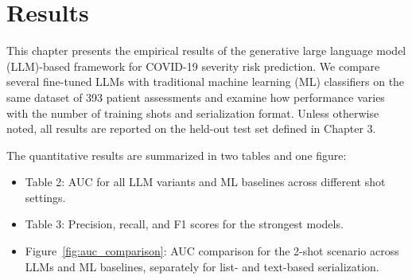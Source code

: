 \section{Results}

This chapter presents the empirical results of the generative large language model (LLM)-based framework for COVID-19 severity risk prediction. We compare several fine-tuned LLMs with traditional machine learning (ML) classifiers on the same dataset of 393 patient assessments and examine how performance varies with the number of training shots and serialization format. Unless otherwise noted, all results are reported on the held-out test set defined in Chapter 3.

The quantitative results are summarized in two tables and one figure:
\begin{itemize}
    \item Table 2: AUC for all LLM variants and ML baselines across different shot settings.
    \item Table 3: Precision, recall, and F1 scores for the strongest models.
    \item Figure~\ref{fig:auc_comparison}: AUC comparison for the 2-shot scenario across LLMs and ML baselines, separately for list- and text-based serialization.
\end{itemize}

